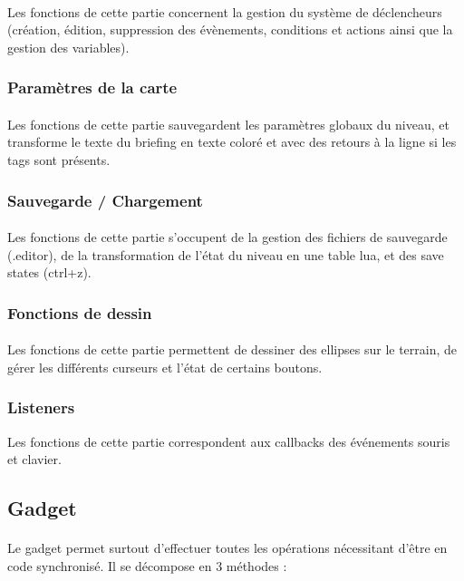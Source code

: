 \documentclass[a4paper]{article}
\begin{document}
\paragraph{}
Les fonctions de cette partie concernent la gestion du système de déclencheurs (création, édition, suppression des évènements, conditions et actions ainsi que la gestion des variables).
\subsubsection{Paramètres de la carte}
\paragraph{}
Les fonctions de cette partie sauvegardent les paramètres globaux du niveau, et transforme le texte du briefing en texte coloré et avec des retours à la ligne si les tags sont présents.
\subsubsection{Sauvegarde / Chargement}
\paragraph{ }
Les fonctions de cette partie s'occupent de la gestion des fichiers de sauvegarde (.editor), de la transformation de l'état du niveau en une table lua, et des save states (ctrl+z).
\subsubsection{Fonctions de dessin}
\paragraph{ }
Les fonctions de cette partie permettent de dessiner des ellipses sur le terrain, de gérer les différents curseurs et l'état de certains boutons.
\subsubsection{Listeners\label{listeners}}
Les fonctions de cette partie correspondent aux callbacks des événements souris et clavier.
\subsection{Gadget}
\paragraph{ }
Le gadget permet surtout d'effectuer toutes les opérations nécessitant d'être en code synchronisé. Il se décompose en 3 méthodes :
\end{document}
